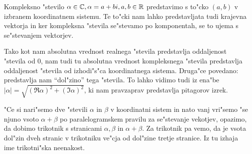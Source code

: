 Kompleksno "stevilo $\alpha \in \mathbb{C}, \alpha = a + bi, a, b \in \mathbb{R}$ predstavimo s to"cko $(a, b)$ v izbranem koordinatnem sistemu. Te to"cki nam lahko predstavljata tudi krajevna vektorja in ker kompleksna "stevila se"stevamo po komponentah, se to ujema s se"stevanjem vektorjev.

Tako kot nam absolutna vrednost realnega "stevila predstavlja oddaljenost "stevila od 0, nam tudi tu absolutna vrednost kompleksnega "stevila predstavlja oddaljenost "stevila od izhodi"s"ca koordinatnega sistema. Druga"ce povedano: predstavlja nam ``dol"zino'' tega "stevila. To lahko vidimo tudi iz ena"be $|\alpha| = \sqrt{(\Re\alpha)^2 + (\Im \alpha)^2}$, ki nam pravzaprav predstavlja pitagorov izrek.

"Ce si nari"semo dve "stevili $\alpha$ in $\beta$ v koordinatni sistem in nato vanj vri"semo "se njuno vsoto $\alpha + \beta$ po paralelogramskem pravilu za se"stevanje vekotjev, opazimo, da dobimo trikotnik s stranicami $\alpha, \beta$ in $\alpha + \beta$. Za trikotnik pa vemo, da je vsota dol"zin dveh stranic v trikotniku ve"cja od dol"zine tretje stranice. Iz tu izhaja ime trikotni"ska neenakost.
